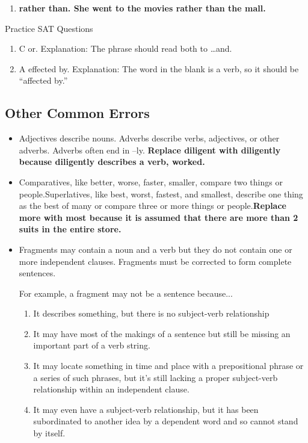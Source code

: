 \begin{enumerate}
\begin{itemize}
\begin{enumerate}
\item \textbf{rather than. She went to the movies rather than the mall.}
\end{enumerate}

\bigskip
Practice SAT Questions
\begin{enumerate}
\item C or. Explanation: The phrase should read both to \ldots and.

\item A effected by. Explanation: The word in the blank is a verb, so it should be ``affected by.''
\end{enumerate}

\subsection{Other Common Errors}

\begin{itemize} 

\item Adjectives describe nouns. Adverbs describe verbs, adjectives, or other adverbs.  Adverbs often end in –ly. \textbf{Replace diligent with diligently because diligently describes a verb, worked.}

\item Comparatives, like better, worse, faster, smaller, compare two things or people.Superlatives, like best, worst, fastest, and smallest, describe one thing as the best of many or compare three or more things or people.\textbf{Replace more with most because it is assumed that there are more than 2 suits in the entire store.}

\item Fragments may contain a noun and a verb but they do not contain one or more independent clauses. Fragments must be corrected to form complete sentences. 

\bigskip
For example, a fragment may not be a sentence because...
\begin{enumerate}
\item{It describes something, but there is no subject-verb relationship}
\item{It may have most of the makings of a sentence but still be missing an important part of a verb string.}
\item{It may locate something in time and place with a prepositional phrase or a series of such phrases, but it's still lacking a proper subject-verb relationship within an independent clause.}
\item{It may even have a subject-verb relationship, but it has been subordinated to another idea by a dependent word and so cannot stand by itself.}
\end{enumerate}


\end{itemize}
\end{itemize}
\end{enumerate}
